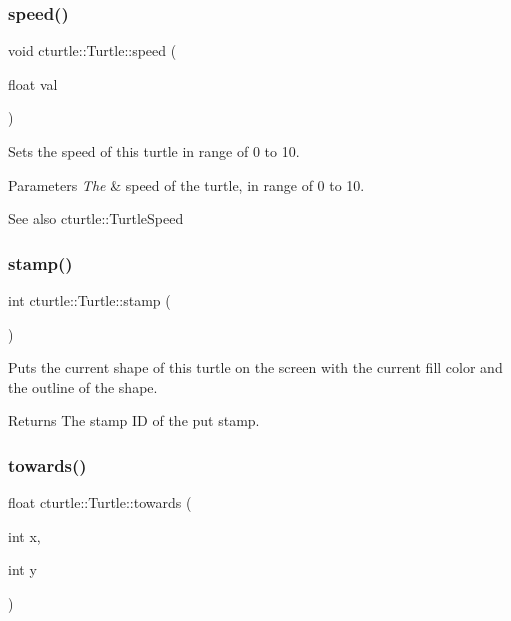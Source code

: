 \subsubsection{\texorpdfstring{speed()}{speed()}}
{\footnotesize\ttfamily void cturtle\+::\+Turtle\+::speed (\begin{DoxyParamCaption}\item[{float}]{val }\end{DoxyParamCaption})\hspace{0.3cm}{\ttfamily [inline]}}



Sets the speed of this turtle in range of 0 to 10. 


\begin{DoxyParams}{Parameters}
{\em The} & speed of the turtle, in range of 0 to 10. \\
\hline
\end{DoxyParams}
\begin{DoxySeeAlso}{See also}
cturtle\+::\+Turtle\+Speed 
\end{DoxySeeAlso}
\mbox{\label{classcturtle_1_1Turtle_af7b7e9c43e22fabce3a5435d09c73f77}} 
\subsubsection{\texorpdfstring{stamp()}{stamp()}}
{\footnotesize\ttfamily int cturtle\+::\+Turtle\+::stamp (\begin{DoxyParamCaption}{ }\end{DoxyParamCaption})}



Puts the current shape of this turtle on the screen with the current fill color and the outline of the shape. 

\begin{DoxyReturn}{Returns}
The stamp ID of the put stamp. 
\end{DoxyReturn}
\mbox{\label{classcturtle_1_1Turtle_a1ac8961a3d5d3044b3f3f011778b51bf}} 
\subsubsection{\texorpdfstring{towards()}{towards()}\hspace{0.1cm}{\footnotesize\ttfamily [1/2]}}
{\footnotesize\ttfamily float cturtle\+::\+Turtle\+::towards (\begin{DoxyParamCaption}\item[{int}]{x,  }\item[{int}]{y }\end{DoxyParamCaption})}



